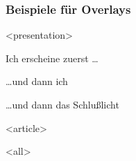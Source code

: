 \begin{frame}[fragile]
\frametitle<presentation>{Beispiele für Overlays} 


\mode
<presentation>

\begin{oenumerate}
 \item Ich erscheine zuerst \ldots
 \item \ldots und dann ich
 \item \ldots und dann das Schlußlicht
\end{oenumerate}


\mode
<article>

\mode
<all>

\end{frame}
\newpage

